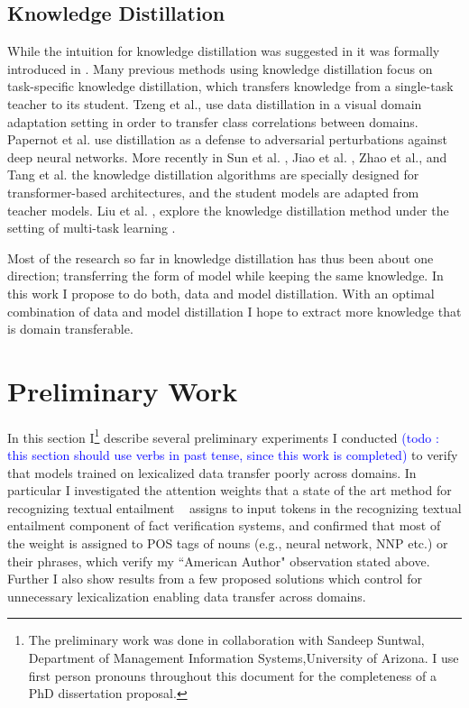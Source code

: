 \documentclass{article}
\newcommand\todo[1]{\textcolor{blue}{(todo : #1)}}
\begin{document}
\subsection{Knowledge Distillation}
While the intuition for knowledge distillation was suggested in \citep*{ba2014deep} it was formally introduced in \citep*{hinton2015distilling}. Many previous methods using knowledge distillation focus on task-specific knowledge distillation, which transfers knowledge from a single-task teacher to its student. Tzeng et al.\citep*{tzeng2015simultaneous}, use data distillation in a visual domain adaptation setting in order to transfer class correlations between domains. Papernot et al. \citep*{papernot2016distillation} use distillation as a defense to adversarial perturbations against deep neural networks. More recently in Sun et al. \citep*{sun2019patient} , Jiao et al. \citep*{jiao2019tinybert},  Zhao et al.\citep*{zhao2019extreme}, and Tang et al. \citep*{tang2019distilling} the knowledge distillation algorithms are specially designed for transformer-based architectures, and the student models are adapted from teacher models. Liu et al. \citep*{liu2019attentive}, explore the knowledge distillation method under the setting of multi-task learning \citep*{caruana1997multitask} \citep*{baxter2000model}.

Most of the research so far in knowledge distillation has thus been about one direction; transferring the form of model while keeping the same knowledge. In this work I propose to do both, data and model distillation. With an optimal combination of data and model distillation I hope to extract more knowledge that is domain transferable.


\section{Preliminary Work}


In this section I\footnote{The preliminary work was done in collaboration with Sandeep Suntwal,  Department of Management Information Systems,University of Arizona. I use first person pronouns throughout this document for the completeness of a PhD dissertation proposal.} describe several preliminary experiments I conducted \todo{this section should use verbs in past tense, since this work is completed} to verify that models trained on lexicalized data transfer poorly across domains. In particular I investigated the attention weights that a state of the art method for recognizing textual entailment ~\citep*{parikh2016decomposable} assigns to input tokens in the recognizing textual entailment component of fact verification systems, and confirmed that most of the weight is assigned to POS tags of nouns (e.g., neural network, NNP etc.) or their phrases, which verify my ``American Author" observation stated above. Further I also show results from a few proposed solutions which control for unnecessary lexicalization enabling data transfer across domains.
\end{document}
